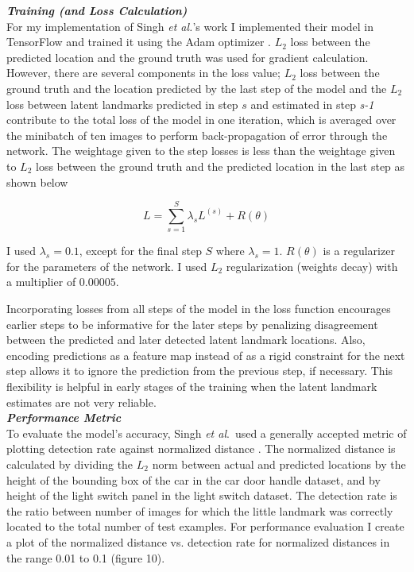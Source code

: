 \documentclass [11pt,letterpaper ,twoside ,openany ]{report}
\begin{document}
    \noindent
    \textbf{\textit{Training (and Loss Calculation)}}\\
    For my implementation of Singh \textit{et al.}'s work I implemented their model in TensorFlow and trained it using the Adam optimizer \cite{kingma2014adam}. \(L_2\) loss between the predicted location and the ground truth was used for gradient calculation. However, there are several components in the loss value; \(L_2\) loss between the ground truth and the location predicted by the last step of the model and the \(L_2\) loss between latent landmarks predicted in step \(s\) and estimated in step \textit {s-1} contribute to the total loss of the model in one iteration, which is averaged over the minibatch of ten images to perform back-propagation of error through the network. The weightage given to the step losses is less than the weightage given to \(L_2\) loss between the ground truth and the predicted location in the last step as shown below

    \[ L =  \displaystyle\sum_{s=1}^{S} \lambda _s L^{(s)} + R(\theta)\]

    \noindent
    I used \( \lambda _s = 0.1 \), except for the final step \(S\) where \( \lambda _s = 1\).  \( R(\theta) \) is a regularizer for the parameters of the network. I used \(L_2\) regularization (weights decay) with a multiplier of \(0.00005\). 
        
    Incorporating losses from all steps of the model in the loss function encourages earlier steps to be informative for the later steps by penalizing disagreement between the predicted and later detected latent landmark locations. Also, encoding predictions as a feature map instead of as a rigid constraint for the next step allows it to ignore the prediction from the previous step, if necessary. This flexibility is helpful in early stages of the training when the latent landmark estimates are not very reliable.\\

    \noindent
    \textbf{\textit{Performance Metric}}\\
    To evaluate the model's accuracy, Singh \textit{et al}.\ used a generally accepted metric of plotting detection rate against normalized distance  \cite{godil2014performance}. The normalized distance is calculated by dividing the \(L_2\) norm between actual and predicted locations by the height of the bounding box of the car in the car door handle dataset,  and by height of the light switch panel in the light switch dataset. The detection rate is the ratio between number of images for which the little landmark was correctly located to the total number of test examples. For performance evaluation I create a plot of the normalized distance vs. detection rate for normalized distances in the range 0.01 to 0.1 (figure 10).
\end{document}
